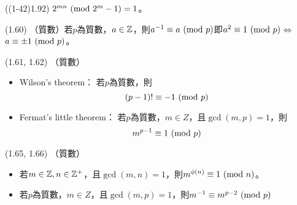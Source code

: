 \item \begin{theorem}{((1-42)1.92)} $2^{mn} \ (\mathrm{mod}\ 2^m - 1) = 1$。
\end{theorem}

\item \begin{theorem}{(1.60)} （質數）若$p$為質數，$a \in \mathbb{Z}$，則$a^{-1} \equiv a \ (\mathrm{mod}\ p)$即$a^2 \equiv 1 \ (\mathrm{mod}\ p)$$\iff$$a \equiv \pm 1 \ (\mathrm{mod}\ p)$。
\end{theorem}

\item \begin{theorem}{(1.61, 1.62)} （質數）
    \begin{itemize}
        \item Wilson's theorem：
        若$p$為質數，則
        \begin{equation}
            (p - 1)! \equiv -1 \ (\mathrm{mod}\ p)
        \end{equation}
        \item Fermat's little theorem：
        若$p$為質數，$m \in Z$，且$\gcd(m, p) = 1$，則
        \begin{equation}
            m^{p - 1} \equiv 1 \ (\mathrm{mod}\ p)
        \end{equation}
    \end{itemize}
\end{theorem}

\item \begin{theorem}{(1.65, 1.66)} （質數）
    \begin{itemize}
        \item 若$m \in \mathbb{Z}, n \in \mathbb{Z}^+$，且$\gcd(m, n) = 1$，則$m^{\phi(n)} \equiv 1 \ (\mathrm{mod}\ n)$。
        \item 若$p$為質數，$m \in Z$，且$\gcd(m, p) = 1$，則$m^{-1} \equiv m^{p - 2} \ (\mathrm{mod}\ p)$
    \end{itemize}
\end{theorem}

